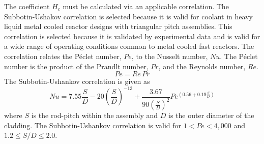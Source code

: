       The coefficient $H_c$ must be calculated via an applicable correlation.
      The Subbotin-Ushakov correlation is selected because it is valid for 
      coolant in heavy liquid metal cooled reactor designs with triangular 
      pitch assemblies. 
      This correlation is selected because it is validated by experimental data
      and is valid for a wide range of operating conditions common to metal 
      cooled fast reactors. The correlation relates the P\'eclet number, $Pe$,
      to the Nusselt number, $Nu$. The P\'eclet number is the product of the 
      Prandlt number, $Pr$, and the Reynolds number, $Re$.
      \begin{equation}
        \label{eq:peclet}
        Pe = Re \, Pr
      \end{equation}
      The Subbotin-Ushankov correlation is given as
      \begin{equation}
        \label{eq:subbotinUshakov}
        Nu = 7.55 \frac{S}{D} - 20 \left(\frac{S}{D}\right)^{-13} + 
          \frac{3.67}{90\left(\frac{S}{D}\right)^{2}}
          Pe^{\left(0.56 + 0.19 \frac{S}{D}\right)}
      \end{equation}
      where $S$ is the rod-pitch within the assembly and $D$ is the outer 
      diameter of the cladding. The Subbotin-Ushankov correlation is valid for
      ${ 1 < Pe < 4,000 }$ and ${1.2 \le S/D \le 2.0}$.

